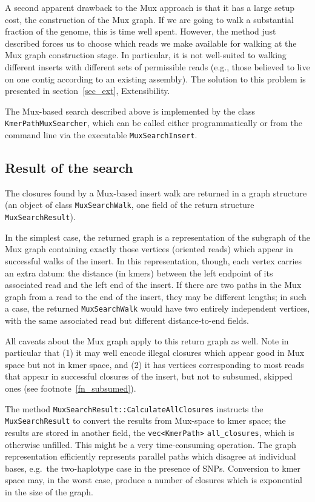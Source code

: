 \documentclass[11pt]{article}
\begin{document}
A second apparent drawback to the Mux approach is that it has a large setup cost,
the construction of the Mux graph.  If we are going to walk a substantial fraction of
the genome, this is time well spent.  However, the method just described forces us to
choose which reads we make available for walking at the Mux graph construction
stage.  In particular, it is not well-suited to walking different inserts with different sets
of permissible reads (e.g., those believed to live on one contig according to an
existing assembly).  The solution to this problem is presented in section~\ref{sec_ext},
Extensibility.

The Mux-based search described above is implemented by the class
{\tt KmerPathMuxSearcher}, which can be called either programmatically or
from the command line via the executable {\tt MuxSearchInsert}.

\subsection*{Result of the search}

The closures found by a Mux-based insert walk are returned in a graph structure
(an object of class {\tt MuxSearchWalk}, one field of the return structure
{\tt MuxSearchResult}).

In the simplest case, the returned graph is a representation 
of the subgraph of the Mux graph containing exactly those vertices (oriented reads)
which appear in successful walks of the insert.  In this representation, though, each
vertex carries an extra datum: the distance (in kmers) between the left endpoint of
its associated read and the left end of the insert.  If there are two paths in the Mux graph
from a read to the end of the insert, they may be different lengths; in such a case,
the returned {\tt MuxSearchWalk} would have two entirely independent vertices,
with the same associated read but different distance-to-end fields.

All caveats about the Mux graph apply to this return graph as well.  Note in particular that
(1) it may well encode illegal closures which appear good in Mux space but not in kmer
space, and (2) it has vertices corresponding to most reads that appear in successful
closures of the insert, but not to subsumed, skipped ones (see footnote~\ref{fn_subsumed}).

The method {\tt MuxSearchResult::CalculateAllClosures} instructs the {\tt MuxSearchResult}
to convert the results from Mux-space to kmer space; the results are stored in another
field, the \verb"vec<KmerPath>" \verb"all_closures", which is otherwise unfilled. 
This might be a very time-consuming operation.  The graph representation
efficiently represents parallel paths which disagree at individual bases, 
e.g.~the two-haplotype case in the presence of SNPs.  Conversion to kmer space may,
in the worst case, produce a number of closures which is exponential in the size of the
graph.
\end{document}
